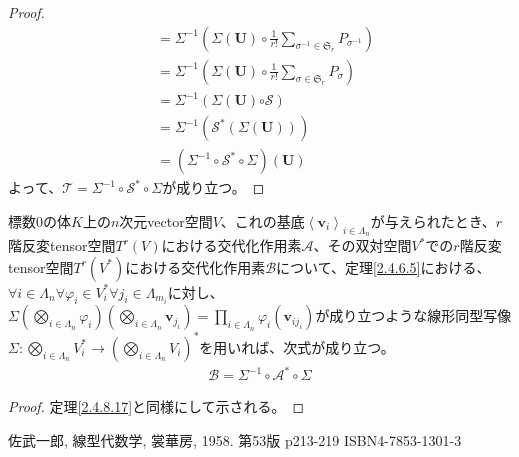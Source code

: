 \documentclass[dvipdfmx]{jsarticle}
\begin{document}
\begin{proof}
\begin{align*}
&= \varSigma^{- 1}\left( \varSigma\left( \mathbf{U} \right) \circ \frac{1}{r!}\sum_{\sigma^{- 1} \in \mathfrak{S}_{r}} P_{\sigma^{- 1}} \right)\\
&= \varSigma^{- 1}\left( \varSigma\left( \mathbf{U} \right) \circ \frac{1}{r!}\sum_{\sigma \in \mathfrak{S}_{r}} P_{\sigma} \right)\\
&= \varSigma^{- 1}\left( \varSigma\left( \mathbf{U} \right)\mathcal{\circ S} \right)\\
&= \varSigma^{- 1}\left( \mathcal{S}^{*}\left( \varSigma\left( \mathbf{U} \right) \right) \right)\\
&= \left( \varSigma^{- 1} \circ \mathcal{S}^{*} \circ \varSigma \right)\left( \mathbf{U} \right)
\end{align*}
よって、$\mathcal{T} =\varSigma^{- 1} \circ \mathcal{S}^{*} \circ \varSigma$が成り立つ。
\end{proof}
\begin{thm}\label{2.4.8.18}
標数$0$の体$K$上の$n$次元vector空間$V$、これの基底$\left\langle \mathbf{v}_{i} \right\rangle_{i \in \varLambda_{n}}$が与えられたとき、$r$階反変tensor空間$T^{r}(V)$における交代化作用素$\mathcal{A}$、その双対空間$V^{*}$での$r$階反変tensor空間$T^{r}(V^{*})$における交代化作用素$\mathcal{B}$について、定理\ref{2.4.6.5}における、$\forall i \in \varLambda_{n}\forall\varphi_{i} \in V_{i}^{*}\forall j_{i} \in \varLambda_{m_{i}}$に対し、$\varSigma\left( \bigotimes_{i \in \varLambda_{n}} \varphi_{i} \right)\left( \bigotimes_{i \in \varLambda_{n}} \mathbf{v}_{j_{i}} \right) = \prod_{i \in \varLambda_{n}} {\varphi_{i}\left( \mathbf{v}_{ij_{i}} \right)}$が成り立つような線形同型写像$\varSigma:\bigotimes_{i \in \varLambda_{n}} V_{i}^{*} \rightarrow \left( \bigotimes_{i \in \varLambda_{n}} V_{i} \right)^{*}$を用いれば、次式が成り立つ。
\begin{align*}
\mathcal{B}=\varSigma^{- 1} \circ \mathcal{A}^{*} \circ \varSigma
\end{align*}
\end{thm}
\begin{proof} 定理\ref{2.4.8.17}と同様にして示される。
\end{proof}\begin{thebibliography}{50}
  佐武一郎, 線型代数学, 裳華房, 1958. 第53版 p213-219 ISBN4-7853-1301-3
\end{thebibliography}
\end{document}
